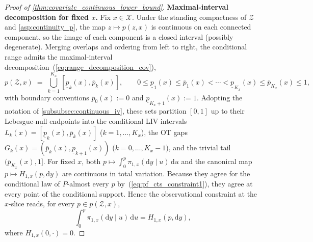 \begin{proof}[Proof of \cref{thm:covariate_continuous_lower_bound}]
\medskip
\noindent\textbf{Maximal-interval decomposition for fixed $x$.}
Fix $x \in \mathcal{X}$. Under the standing compactness of $\mathcal Z$ and \cref{asp:continuity_p}, the map $z \mapsto p(z,x)$ is continuous on each connected component, so the image of each component is a closed interval (possibly degenerate). Merging overlaps and ordering from left to right, the conditional range admits the maximal-interval decomposition~(\ref{eq:range_decomposition_cov}),
\[
    p(\mathcal{Z}, x) \;=\; \bigcup_{k=1}^{K_x}[\underline{p}_k(x), \overline{p}_k(x)], \qquad 0 \leqslant \underline{p}_1(x) \leqslant \overline{p}_1(x) < \cdots < \underline{p}_{K_x}(x) \leqslant \overline{p}_{K_x}(x) \leqslant 1,
\]
with boundary conventions $\overline{p}_0(x) := 0$ and $\underline{p}_{K_x+1}(x) := 1$. Adopting the notation of \cref{subsubsec:continuous_iv}, these sets partition $[0,1]$ up to their Lebesgue-null endpoints into the conditional LIV intervals $L_k(x) = [\underline{p}_k(x), \overline{p}_k(x)]$ ($k=1,\dots,K_x$), the OT gaps $G_k(x) = (\overline{p}_k(x), \underline{p}_{k+1}(x))$ ($k=0,\dots,K_x-1$), and the trivial tail $(\overline{p}_{K_x}(x), 1]$. For fixed $x$, both $p\mapsto\int_0^p\pi_{1,x}(\mathrm dy\mid u)\,\mathrm du$ and the canonical map $p\mapsto H_{1,x}(p,\mathrm dy)$ are continuous in total variation. Because they agree for the conditional law of $P$-almost every $p$ by~(\ref{eq:pf_cts_constraint1}), they agree at every point of the conditional support. Hence the observational constraint at the $x$-slice reads, for every $p \in p(\mathcal{Z}, x)$,
\begin{equation}\label{eq:pf_cts_obs}
    \int_0^{p} \pi_{1,x}(\mathrm{d}y \mid u)\,\mathrm{d}u = H_{1,x}(p,\mathrm{d}y),
\end{equation}
where $H_{1,x}(0,\cdot)=0$.


\end{proof}

